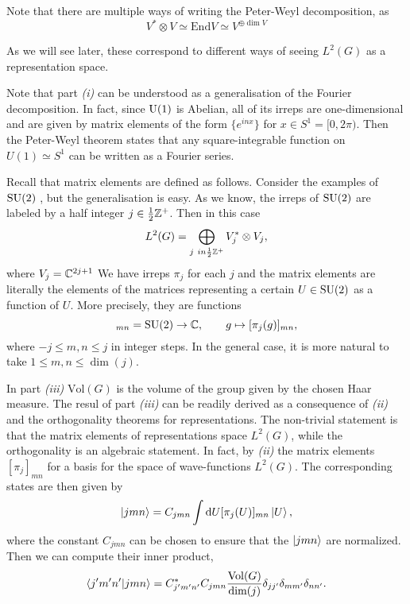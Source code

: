 Note that there are multiple ways of writing the Peter-Weyl decomposition, as
\begin{equation}
    V^{\ast} \otimes V \simeq \mathrm{End}V \simeq V^{\oplus \dim V}
\end{equation}

As we will see later, these correspond to different ways of seeing $L^2(G)$ as a representation space.

Note that part \emph{(i)} can be understood as a generalisation of the Fourier decomposition.
In fact, since $\mathrm{U}(1)$ is Abelian, all of its irreps are one-dimensional and are given by matrix elements of the form $\{e^{i n x}\}$ for $x \in S^{1} = [0, 2 \pi)$.
Then the Peter-Weyl theorem states that any square-integrable function on $U(1) \simeq S^1$ can be written as a Fourier series.

Recall that matrix elements are defined as follows.
Consider the examples of $\text{SU}(2) $ \citneeded, but the generalisation is easy.
As we know, the irreps of $\text{SU}(2) $ are labeled by a half integer $j \in \frac{1}{2} \mathbb{Z}^+$.
Then in this case
\begin{equation}
    L^2 (G) = \bigoplus_{j \ in \frac{1}{2} \mathbb{Z}^+} V_j^{\ast} \otimes V_j,
\end{equation}
where $V_j = \mathbb{C}^{2j + 1}$
We have irreps $\pi_j$ for each $j$ and the matrix elements are literally the elements of the matrices representing a certain $U \in \text{SU}(2)$ as a function of $U$.
More precisely, they are functions
\begin{equation}
    [\pi_j( \cdot )]_{mn} = \SU(2) \to \C, \qquad
    g \mapsto [\pi_j(g)]_{mn},
\end{equation}
where $-j \leq m,n \leq j$ in integer steps.
In the general case, it is more natural to take $1 \leq m,n \leq \dim(j) $.

In part \emph{(iii)} $\mathrm{Vol}(G) $ is the volume of the group given by the chosen Haar measure.
The resul of part \emph{(iii)} can be readily derived as a consequence of \emph{(ii)} and the orthogonality theorems for representations.
The non-trivial statement is that the matrix elements of representations space $L^2(G)$, while the orthogonality is an algebraic statement.
In fact, by \emph{(ii)} the matrix elements $[\pi_j]_{mn}$ for a basis for the space of wave-functions $L^2(G)$.
The corresponding states are then given by
\begin{equation}
    \ket{jmn} = C_{jmn} \int \text{\normalfont d} U [\pi_j(U)]_{mn} \ket{U},
\end{equation}
where the constant $C_{jmn}$ can be chosen to ensure that the $\ket{jmn}$ are normalized.
Then we can compute their inner product,
\begin{equation*}
    \braket{j^{\prime} m^{\prime} n^{\prime}}{jmn} =
    C_{j^{\prime} m^{\prime} n^{\prime}}^{\ast} C_{jmn}
    \frac{\mathrm{Vol}(G)}{\text{\normalfont dim}(j)}
    \delta_{j j^{\prime}} \delta_{m m^{\prime}} \delta_{n n^{\prime}}.
\end{equation*}

